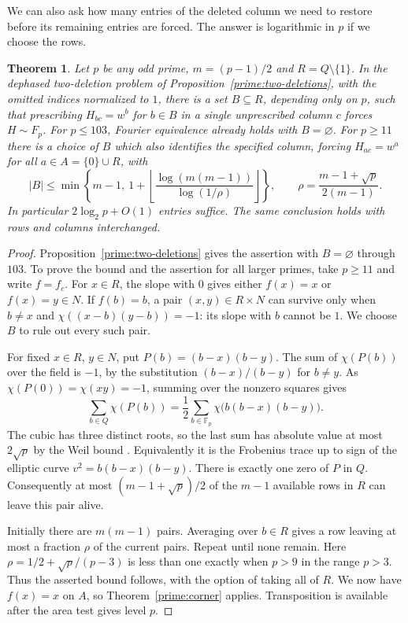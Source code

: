 \documentclass[11pt,a4paper]{article}
\newtheorem{theorem}{Theorem}[section]
\numberwithin{equation}{section}
\begin{document}
We can also ask how many entries of the deleted column we need to restore before its remaining entries are forced. The answer is logarithmic in $p$ if we choose the rows.

\begin{theorem}\label{prime:sparse-column}
Let $p$ be any odd prime, $m=(p-1)/2$ and $R=Q\setminus\{1\}$. In the dephased two-deletion problem of Proposition~\ref{prime:two-deletions}, with the omitted indices normalized to $1$, there is a set $B\subseteq R$, depending only on $p$, such that prescribing $H_{bc}=w^b$ for $b\in B$ in a single unprescribed column $c$ forces $H\sim F_p$. For $p\le103$, Fourier equivalence already holds with $B=\varnothing$. For $p\ge11$ there is a choice of $B$ which also identifies the specified column, forcing $H_{ac}=w^a$ for all $a\in A=\{0\}\cup R$, with
\[
 |B|\le \min\left\{m-1,\ 1+\left\lfloor\frac{\log(m(m-1))}{\log(1/\rho)}\right\rfloor\right\},
 \qquad \rho=\frac{m-1+\sqrt p}{2(m-1)}.
\]
In particular $2\log_2 p+O(1)$ entries suffice. The same conclusion holds with rows and columns interchanged.
\end{theorem}
\begin{proof}
Proposition~\ref{prime:two-deletions} gives the assertion with $B=\varnothing$ through $103$. To prove the bound and the assertion for all larger primes, take $p\ge11$ and write $f=f_c$. For $x\in R$, the slope with $0$ gives either $f(x)=x$ or $f(x)=y\in N$. If $f(b)=b$, a pair $(x,y)\in R\times N$ can survive only when $b\ne x$ and $\chi((x-b)(y-b))=-1$: its slope with $b$ cannot be $1$. We choose $B$ to rule out every such pair.

For fixed $x\in R$, $y\in N$, put $P(b)=(b-x)(b-y)$. The sum of $\chi(P(b))$ over the field is $-1$, by the substitution $(b-x)/(b-y)$ for $b\ne y$. As $\chi(P(0))=\chi(xy)=-1$, summing over the nonzero squares gives
\[
 \sum_{b\in Q}\chi(P(b))
 =\frac12\sum_{b\in\mathbb F_p}\chi\big(b(b-x)(b-y)\big).
\]
The cubic has three distinct roots, so the last sum has absolute value at most $2\sqrt p$ by the Weil bound \cite[Theorem~5.41]{ln}. Equivalently it is the Frobenius trace up to sign of the elliptic curve $v^2=b(b-x)(b-y)$. There is exactly one zero of $P$ in $Q$. Consequently at most $(m-1+\sqrt p)/2$ of the $m-1$ available rows in $R$ can leave this pair alive.

Initially there are $m(m-1)$ pairs. Averaging over $b\in R$ gives a row leaving at most a fraction $\rho$ of the current pairs. Repeat until none remain. Here $\rho=1/2+\sqrt p/(p-3)$ is less than one exactly when $p>9$ in the range $p>3$. Thus the asserted bound follows, with the option of taking all of $R$. We now have $f(x)=x$ on $A$, so Theorem~\ref{prime:corner} applies. Transposition is available after the area test gives level $p$.
\end{proof}
\end{document}
